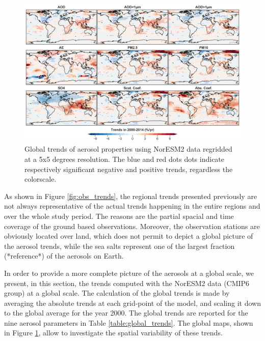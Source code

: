 \documentclass[journal abbreviation, manuscript]{copernicus}
\begin{document}
\begin{figure}[t]
 \includegraphics[width=16cm]{../scripts/figs/trends_map2.png}
 \caption{Global trends of aerosol properties using NorESM2 data regridded at a 5x5 degrees resolution. The blue and red dots dots indicate respectively significant negative and positive trends, regardless the colorscale.}
 \label{fig:global_trends}
\end{figure}

As shown in Figure \ref{fig:obs_trends}, the regional trends presented previously are not always representative of the actual trends happening in the entire regions and over the whole study period. The reasons are the partial spacial and time coverage of the ground based observations. Moreover, the observation stations are obviously located over land, which does not permit to depict a global picture of the aerosol trends, while the sea salts represent one of the largest fraction (*reference*) of the aerosols on Earth.

In order to provide a more complete picture of the aerosols at a global scale, we present, in this section, the trends computed with the NorESM2 data (CMIP6 group) at a global scale. The calculation of the global trends is made by averaging the absolute trends at each grid-point of the model, and scaling it down to the global average for the year 2000. The global trends are reported for the nine aerosol parameters in Table \ref{table:global_trends}. The global maps, shown in Figure \ref{fig:global_trends}, allow to investigate the spatial variability of these trends.
\end{document}
